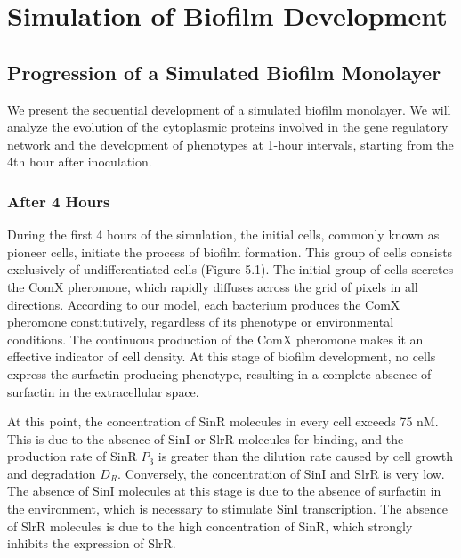 
\chapter{Simulation of Biofilm Development}\label{chap:contrib3}

\section{Progression of a Simulated Biofilm Monolayer}

We present the sequential development of a simulated biofilm monolayer. We will analyze the evolution of the cytoplasmic proteins involved in the gene regulatory network and the development of phenotypes at 1-hour intervals, starting from the 4th hour after inoculation.

\subsection{After 4 Hours}\label{sec:contrib3:theme1}

During the first 4 hours of the simulation, the initial cells, commonly known as pioneer cells, initiate the process of biofilm formation. This group of cells consists exclusively of undifferentiated cells (Figure 5.1). The initial group of cells secretes the ComX pheromone, which rapidly diffuses across the grid of pixels in all directions. According to our model, each bacterium produces the ComX pheromone constitutively, regardless of its phenotype or environmental conditions. The continuous production of the ComX pheromone makes it an effective indicator of cell density. At this stage of biofilm development, no cells express the surfactin-producing phenotype, resulting in a complete absence of surfactin in the extracellular space.

At this point, the concentration of SinR molecules in every cell exceeds 75 nM. This is due to the absence of SinI or SlrR molecules for binding, and the production rate of SinR \(P_3\) is greater than the dilution rate caused by cell growth and degradation \(D_{R}\). Conversely, the concentration of SinI and SlrR is very low. The absence of SinI molecules at this stage is due to the absence of surfactin in the environment, which is necessary to stimulate SinI transcription. The absence of SlrR molecules is due to the high concentration of SinR, which strongly inhibits the expression of SlrR.

